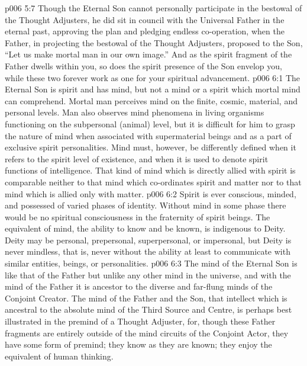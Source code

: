 \vs p006 5:7 Though the Eternal Son cannot personally participate in the bestowal of the Thought Adjusters, he did sit in council with the Universal Father in the eternal past, approving the plan and pledging endless co\hyp{}operation, when the Father, in projecting the bestowal of the Thought Adjusters, proposed to the Son, “Let us make mortal man in our own image.” And as the spirit fragment of the Father dwells within you, so does the spirit presence of the Son envelop you, while these two forever work as one for your spiritual advancement.
\vs p006 6:1 The Eternal Son is spirit and has mind, but not a mind or a spirit which mortal mind can comprehend. Mortal man perceives mind on the finite, cosmic, material, and personal levels. Man also observes mind phenomena in living organisms functioning on the subpersonal (animal) level, but it is difficult for him to grasp the nature of mind when associated with supermaterial beings and as a part of exclusive spirit personalities. Mind must, however, be differently defined when it refers to the spirit level of existence, and when it is used to denote spirit functions of intelligence. That kind of mind which is directly allied with spirit is comparable neither to that mind which co\hyp{}ordinates spirit and matter nor to that mind which is allied only with matter.
\vs p006 6:2 Spirit is ever conscious, minded, and possessed of varied phases of identity. Without mind in some phase there would be no spiritual consciousness in the fraternity of spirit beings. The equivalent of mind, the ability to know and be known, is indigenous to Deity. Deity may be personal, prepersonal, superpersonal, or impersonal, but Deity is never mindless, that is, never without the ability at least to communicate with similar entities, beings, or personalities.
\vs p006 6:3 The mind of the Eternal Son is like that of the Father but unlike any other mind in the universe, and with the mind of the Father it is ancestor to the diverse and far\hyp{}flung minds of the Conjoint Creator. The mind of the Father and the Son, that intellect which is ancestral to the absolute mind of the Third Source and Centre, is perhaps best illustrated in the premind of a Thought Adjuster, for, though these Father fragments are entirely outside of the mind circuits of the Conjoint Actor, they have some form of premind; they know as they are known; they enjoy the equivalent of human thinking.
